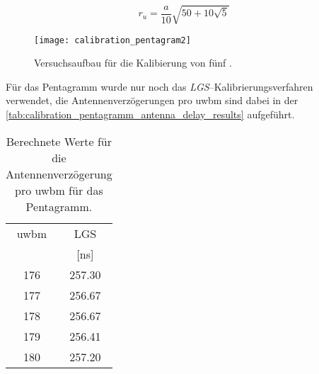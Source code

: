 \begin{equation}
r_u = \frac{a}{10} \sqrt{50 + 10 \sqrt{5}} \label{eq:pentagramm_umkreisradius}
\end{equation}

\begin{figure}[h]
	\centering
	\texttt{[image: calibration\_pentagram2]}
	\caption{Versuchsaufbau für die Kalibierung von fünf .}
	\label{fig:calibration_pentagram2}
\end{figure}

Für das Pentagramm wurde nur noch das \textit{LGS}--Kalibrierungsverfahren verwendet, die Antennenverzögerungen pro \Gls{uwbm} sind dabei in der \autoref{tab:calibration_pentagramm_antenna_delay_results} aufgeführt.

\begin{table}[h]
	\centering
	\begin{tabular}{||c||c||}
\hline
\Gls{uwbm} & LGS \\
 & [\si{\nano\second}] \\
\hline\hline
176 & \num{257.30} \\
177 & \num{256.67} \\
178 & \num{256.67} \\
179 & \num{256.41} \\
180 & \num{257.20} \\

\hline
	\end{tabular}
	\caption{Berechnete Werte für die Antennenverzögerung pro \Gls{uwbm} für das Pentagramm.}
	\label{tab:calibration_pentagramm_antenna_delay_results}
\end{table}


\begin{comment}
--------------------------------------------------------------------------------
- Wie verändert sich die Genauigkeit der Entfernungsmessung bei einer direkten Sichtverbindung (engl. Line--of--sight (LOS)) und indirekten Sichtverbindung (engl. Non--line--of--sight (NLOS))?
- Stochastik
	- https://matheguru.com/stochastik/mittel-durchschnitt-und-lageparameter.html
	- https://matheguru.com/stochastik/standardabweichung.html
	- https://matheguru.com/stochastik/standardfehler.html
\end{comment}
